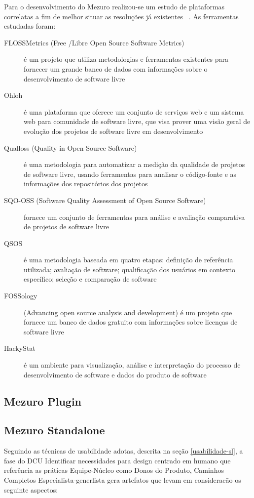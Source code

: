 Para o desenvolvimento do Mezuro realizou-se um estudo de plataformas correlatas a fim de melhor situar as resoluções já existentes~\cite{meirelles2013}%
. As ferramentas estudadas foram:

\begin{description}
\item[FLOSSMetrics (Free /Libre Open Source Software Metrics)]
é um projeto que utiliza metodologias e ferramentas existentes para fornecer um grande banco de dados com informações sobre o desenvolvimento de software livre
\item[Ohloh]
é uma plataforma que oferece um conjunto de serviços web e um sistema web para comunidade de software livre, que visa prover uma visão geral de evolução dos projetos de software livre em desenvolvimento
\item[Qualloss (Quality in Open Source Software)]
é uma metodologia para automatizar a medição da qualidade de projetos de software livre, usando ferramentas para analisar o código-fonte e as informações dos repositórios dos projetos
\item[SQO-OSS (Software Quality Assessment of Open Source Software)]
fornece um conjunto de ferramentas para análise e avaliação comparativa de projetos de software livre
\item[QSOS]
é uma metodologia baseada em quatro etapas: definição de referência utilizada; avaliação de software; qualificação dos usuários em contexto específico; seleção e comparação de software
\item[FOSSology]
(Advancing open source analysis and development) é um projeto que fornece um banco de dados gratuito com informações sobre licenças de software livre
\item[HackyStat]
é um ambiente para visualização, análise e interpretação do processo de desenvolvimento de software e dados do produto de software
\end{description}

\subsection{Mezuro Plugin}
\label{mezuro-plugin}

\subsection{Mezuro Standalone}
\label{mezuro-standalone}

Seguindo as técnicas de usabilidade adotas, descrita na seção \ref{usabilidade-sl}, a fase do DCU Identificar necessidades para design centrado em humano que referência as práticas Equipe-Núcleo como Donos do Produto, Caminhos Completos Especialista-generlista gera artefatos que levam em consideracão os seguinte aspectos:

